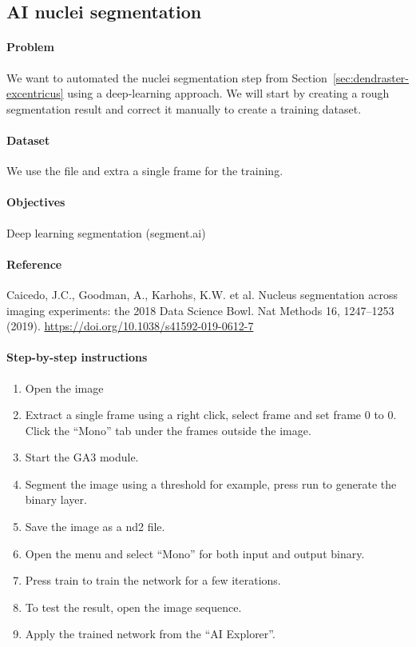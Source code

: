 \subsection{AI nuclei segmentation} \label{sec:ai-nuclei-segmentation}


\paragraph{Problem} We want to automated the nuclei segmentation step from Section~\ref{sec:dendraster-excentricus} using a deep-learning approach. We will start by creating a rough segmentation result and correct it manually to create a training dataset.

\paragraph{Dataset} We use the file   and extra a single frame for the training.

\paragraph{Objectives} Deep learning segmentation (segment.ai)

\paragraph{Reference} Caicedo, J.C., Goodman, A., Karhohs, K.W. et al. Nucleus segmentation across imaging experiments: the 2018 Data Science Bowl. Nat Methods 16, 1247–1253 (2019). \url{https://doi.org/10.1038/s41592-019-0612-7}

\paragraph{Step-by-step instructions}
\begin{enumerate}
    \item Open the image  
    \item Extract a single frame using a right click, select frame and set frame 0 to 0. Click the ``Mono'' tab under the frames outside the image.
    \item Start the GA3 module.
    \item Segment the image using a threshold for example, press run to generate the binary layer.
    \item Save the image as a nd2 file.
    \item Open the menu  and select ``Mono'' for both input and output binary.
    \item Press train to train the network for a few iterations.
    \item To test the result, open the image sequence.
    \item Apply the trained network from the ``AI Explorer''.
\end{enumerate}
